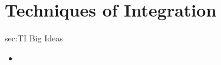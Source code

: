 \chapter{Techniques of Integration}
\label{chap:TI}

\begin{bigideas}{sec:TI Big Ideas}
\begin{itemize}
  \item 
\end{itemize}
\end{bigideas}